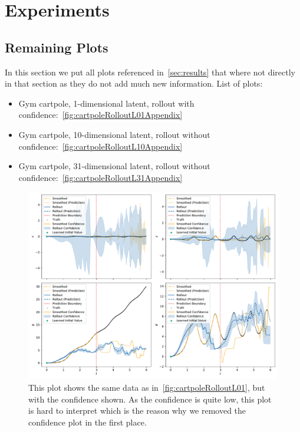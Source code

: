 \chapter{Experiments}



\section{Remaining Plots}
	\label{app:remainingPlots}

	In this section we put all plots referenced in~\autoref{sec:results} that where not directly in that section as they do not add much new information. List of plots:
	\begin{itemize}
		\item Gym cartpole, 1-dimensional latent, rollout with confidence:~\autoref{fig:cartpoleRolloutL01Appendix}
		\item Gym cartpole, 10-dimensional latent, rollout without confidence:~\autoref{fig:cartpoleRolloutL10Appendix}
		\item Gym cartpole, 31-dimensional latent, rollout without confidence:~\autoref{fig:cartpoleRolloutL31Appendix}
	\end{itemize}

	\begin{figure}
		\centering
		\includegraphics[width=\linewidth]{figures/results/cartpole-gym/run-latent-dim-02/rollout-observations-N0.pdf}
		\caption{This plot shows the same data as in~\autoref{fig:cartpoleRolloutL01}, but with the confidence shown. As the confidence is quite low, this plot is hard to interpret which is the reason why we removed the confidence plot in the first place.}
		\label{fig:cartpoleRolloutL01Appendix}
	\end{figure}

